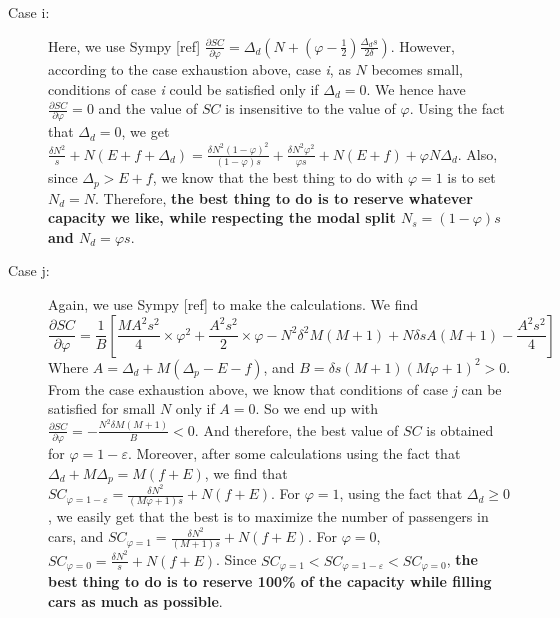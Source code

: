 \documentclass[english, a4paper]{article}
\theoremstyle{plain}
\theoremstyle{definition}
\theoremstyle{remark}
\begin{document}
\begin{description}
            \item[Case i:] Here, we use Sympy [ref] $\frac{\partial SC}{\partial \varphi} = \Delta_d \left( N + \left( \varphi - \frac{1}{2}\right) \frac{\Delta_d s}{2 \delta} \right)$. However, according to the case exhaustion above, case \emph{i}, as $N$ becomes small, conditions of case \emph{i} could be satisfied only if $\Delta_d = 0$. We hence have $\frac{\partial SC}{\partial \varphi} = 0$ and the value of $SC$ is insensitive to the value of $\varphi$. Using the fact that $\Delta_d = 0$, we get $\frac{\delta N^2}{s} + N(E + f + \Delta_d) = \frac{\delta N^2 (1 - \varphi)^2}{(1 - \varphi)s} + \frac{\delta N^2 \varphi^2}{\varphi s} + N(E + f) + \varphi N\Delta_d$. Also, since $\Delta_p > E + f$, we know that the best thing to do with $\varphi = 1$ is to set $N_d = N$. Therefore, \textbf{the best thing to do is to reserve whatever capacity we like, while respecting the modal split $N_s = (1-\varphi)s$ and $N_d = \varphi s$}.

            \item[Case j:] Again, we use Sympy [ref] to make the calculations. We find
            \begin{equation}
                \frac{\partial SC}{\partial \varphi} = \frac{1}{B}\left[ \frac{M A^2 s^2}{4} \times \varphi^2  + \frac{A^2 s^2}{2} \times \varphi - N^2 \delta ^2 M (M+ 1) + N\delta s A(M+1) -\frac{A^2 s^2}{4} \right]
            \end{equation} Where $A = \Delta_d + M(\Delta_p - E - f)$, and $B = \delta s (M+1)(M\varphi + 1)^2 >0$. From the case exhaustion above, we know that conditions of case \emph{j} can be satisfied for small $N$ only if $A = 0$. So we end up with $\frac{\partial SC}{\partial \varphi} = -\frac{N^2\delta M(M+1)}{B} < 0$. And therefore, the best value of $SC$ is obtained for $\varphi = 1 - \varepsilon$. Moreover, after some calculations using the fact that $\Delta_d + M\Delta_p = M(f + E)$, we find that $SC_{\varphi = 1 - \varepsilon} = \frac{\delta N^2}{(M\varphi + 1)s} + N(f+E)$. For $\varphi = 1$, using the fact that $\Delta_d \geq 0$, we easily get that the best is to maximize the number of passengers in cars, and $SC_{\varphi = 1} = \frac{\delta N^2}{(M + 1)s} + N(f+E)$. For $\varphi = 0$, $SC_{\varphi = 0} = \frac{\delta N^2}{s} + N(f+E)$. Since $SC_{\varphi = 1} < SC_{\varphi = 1-\varepsilon} < SC_{\varphi = 0}$, \textbf{the best thing to do is to reserve 100\% of the capacity while filling cars as much as possible}.
        \end{description}
\end{document}
